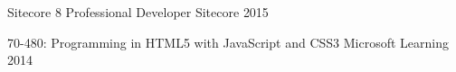 

\begin{cvhonors}

  \cvhonor
    {Sitecore 8 Professional Developer} %
    {Sitecore} %
    {}
    {2015} %

  \cvhonor
    {70-480: Programming in HTML5 with JavaScript and CSS3} %
    {Microsoft Learning} %
    {}
    {2014} %

\end{cvhonors}
